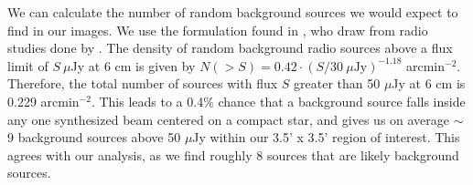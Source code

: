 \documentclass[apj]{emulateapj}
\begin{document}
We can calculate the number of random background sources we would expect to find in our images. We use the formulation found in \citet{Shirley07}, who draw from radio studies done by \citet{Fomalont91}. The density of random background radio sources above a flux limit of $S\ \mu$Jy at 6 cm is given by $N(>S) = 0.42\cdot(S/30\ \mu \text{Jy})^{-1.18}$ arcmin$^{-2}$. Therefore, the total number of sources with flux $S$ greater than 50 $\mu$Jy at 6 cm is 0.229 arcmin$^{-2}$. This leads to a 0.4\% chance that a background source falls inside any one synthesized beam centered on a compact star, and gives us on average $\sim$9 background sources above 50 $\mu$Jy within our 3.5' x 3.5' region of interest. This agrees with our analysis, as we find roughly 8 sources that are likely background sources.



\
\end{document}
